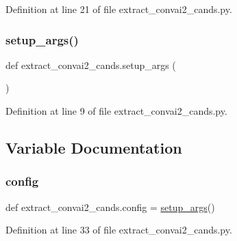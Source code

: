Definition at line 21 of file extract\+\_\+convai2\+\_\+cands.\+py.

\mbox{\label{namespaceextract__convai2__cands_a7f48dc848fff4ab34dc553d70b0874e1}} 
\subsubsection{\texorpdfstring{setup\+\_\+args()}{setup\_args()}}
{\footnotesize\ttfamily def extract\+\_\+convai2\+\_\+cands.\+setup\+\_\+args (\begin{DoxyParamCaption}{ }\end{DoxyParamCaption})}



Definition at line 9 of file extract\+\_\+convai2\+\_\+cands.\+py.



\subsection{Variable Documentation}
\mbox{\label{namespaceextract__convai2__cands_a259117907f3e71d8a7bbcbc7fc95b8a9}} 
\subsubsection{\texorpdfstring{config}{config}}
{\footnotesize\ttfamily def extract\+\_\+convai2\+\_\+cands.\+config = \hyperlink{namespaceextract__convai2__cands_a7f48dc848fff4ab34dc553d70b0874e1}{setup\+\_\+args}()}



Definition at line 33 of file extract\+\_\+convai2\+\_\+cands.\+py.

